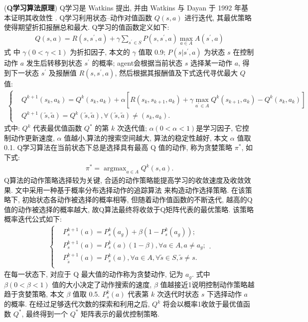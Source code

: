 (\textbf{Q学习算法原理}\cite{Yutao2011})
Q学习是 Watkins 提出, 并由 Watkins 与 Dayan 于 1992 年基本证明其收敛性 \cite{watkins1992q}.
Q学习利用状态–动作对值函数 $Q(s,a)$ 进行迭代, 其最优策略使得期望折扣报酬总和最大.
Q学习的值函数定义如下:
\begin{eqnarray}
  Q(s,a) =R(s,s^{'}, a) + \gamma\sum_{s^{'}\in S}P(s,s^{'}, a)\max_{a\in A}A(s^{'},a)
\end{eqnarray}
式 中 $\gamma(0 <\gamma< 1)$ 为折扣因子, 本文的 $\gamma$ 值取 0.9;
$P(s|s^{'},a)$ 为状态 $s$ 在控制动作 $a$ 发生后转移到状态 $s^{'}$ 的概率; agent会根据当前状态 $s$ 选择某一动作 $a$, 得
到下一状态 $s^{'}$ 及报酬值 $R(s,s^{'},a)$, 然后根据其报酬值及下式迭代寻优最大 $Q$ 值:
\begin{eqnarray}
  \left\{\begin{array}{ll}
    &Q^{k+1}(s_k,a_k)=Q^{k}(s_k,a_k)+\alpha[R(s_k,s_{k+1},a_k)+\gamma\max\limits_{a^{'}\in A}Q^{k}(s_{k+1},a_k)-Q^{k}(s_k,a_k)]\\
    &Q^{k+1}(\tilde{s},\tilde{a})=Q^{k}(\tilde{s},\tilde{a}),\forall (\tilde{s},\tilde{a})\neq (s_k,a_k).
  \end{array}\right.
\end{eqnarray}
式中: $Q^k$ 代表最优值函数 $Q^{*}$ 的第 $k$ 次迭代值; $\alpha(0 <\alpha< 1)$是学习因子, 它控制动作更新速度, $\alpha$ 值越小,算法的搜索空间越大, 算法的稳定性越好, 本文 $\alpha$ 值取 0.1.
Q学习算法在当前状态下总是选择具有最高 Q 值的动作, 称为贪婪策略 $\pi^{*}$, 如下式:
\begin{eqnarray}
  \pi^{*}=\mathop{\arg\max}_{a\in A}Q^k (s,a).
\end{eqnarray}
Q算法的动作策略选择较为关键, 合适的动作策略能提高学习的收敛速度及收敛效果. 文中采用一种基于概率分布选择动作的追踪算法
\cite{sutton1998reinforcement} 来构造动作选择策略. 在该策略下, 初始状态各动作被选择的概率相等, 但随着动作值函数的不断迭代, 越高的Q值的动作被选择的概率越大, 故Q算法最终将收敛于Q矩阵代表的最优策略.
该策略概率迭代公式如下:
\begin{eqnarray}
  \left\{\begin{array}{ll}
    &P^{k+1}_s(a)=P^k_s(a_g)+\beta(1-P^k_s(a_g));\\
    &P^{k+1}_s(a)=P^k_s(a)(1-\beta),\forall a\in A, a\neq a_g;\\
    &P^{k+1}_{\tilde{s}}(a)=P^k_{\tilde{s}}(a),\forall a\in A, \forall \tilde{s}\in S,\tilde{s}\neq s.\\
  \end{array}\right..
\end{eqnarray}
在每一状态下, 对应于 Q 最大值的动作称为贪婪动作, 记为 $a_g$. 式中 $\beta(0 <\beta < 1)$ 值的大小决定了动作搜索的速度, $\beta$ 值越接近1说明控制动作策略越趋于贪婪策略, 本文 $\beta$ 值取 0.5.
$P^k_s(a)$ 代表第 $k$ 次迭代时状态 $s$ 下选择动作 $a$ 的概率.
在经过足够迭代次数的探索和利用之后, $Q^k$ 将会以概率1收敛于最优值函数 $Q^{*}$, 最终得到一个 $Q^{*}$ 矩阵表示的最优控制策略.

